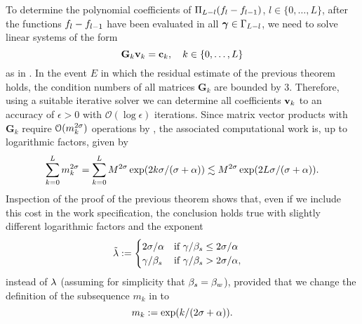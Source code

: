 \begin{rem}
	To determine the polynomial coefficients of $\Pi_{L-l}(f_{l}-f_{l-1})$, $l\in\{0,\dots,L\}$, after the functions $f_{l}-f_{l-1}$ have been evaluated in all $\bm{\gamma}\in \Gamma_{L-l}$, we need to solve linear systems of the form
	\begin{equation}
	\mathbf{G}_k\mathbf{v}_k=\mathbf{c}_k,\quad k\in\{0,\dots,L\}
	\end{equation}
		as in . In the event $E$ in which the residual estimate of the previous theorem holds, the condition numbers of all matrices $\mathbf{G}_k$ are bounded by 3. Therefore, using a suitable iterative solver  we can determine all coefficients $\mathbf{v}_k$ to an accuracy of $\epsilon>0$ with $\mathcal{O}(\log\epsilon)$ iterations. Since matrix vector products with $\mathbf{G}_k$ require $\mathcal{O}(m_k^{2\sigma})$ operations by , the associated computational work is, up to logarithmic factors, given by
		\begin{equation*}
		\sum_{k=0}^{L}m_k^{2\sigma}=\sum_{k=0}^{L}M^{2\sigma}\exp(2k\sigma/(\sigma+\alpha))\lesssim M^{2\sigma}\exp(2L\sigma/(\sigma+\alpha)).
		\end{equation*}
	Inspection of the proof of the previous theorem shows that, even if we include this cost in the work specification, the conclusion holds true with slightly different logarithmic factors and the exponent
		\begin{align*}
		\tilde{\lambda}&:=\begin{cases}
		2\sigma/\alpha& \text{if } \gamma/\beta_{s}\leq 2\sigma/\alpha\\
		\gamma/\beta_{s}& \text{if }\gamma/\beta_{s}>2\sigma/\alpha,
		\end{cases}
		\end{align*}
		instead of $\lambda$ (assuming for simplicity that $\beta_{s}=\beta_{w}$), provided that we change the definition of the subsequence $m_k$ in  to 
		$$
		m_k:=\exp(k/(2\sigma+\alpha)).
		$$
	\end{rem}

